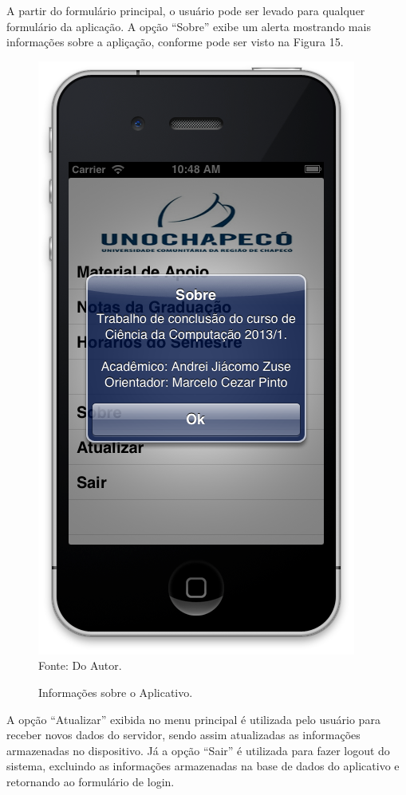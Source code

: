 A partir do formulário principal, o usuário pode ser levado para qualquer formulário da aplicação. A opção ``Sobre'' exibe um alerta mostrando mais informações sobre a apliçação, conforme pode ser visto na Figura 15.

\begin{figure}[!htb]
     \centering
     \caption[Formulário Principal - Sobre]{Informações sobre o Aplicativo.}
     \includegraphics[scale=0.34]{imagens/formsobre.png}
     \\  Fonte: Do Autor.
\end{figure}
\newpage

A opção ``Atualizar'' exibida no menu principal é utilizada pelo usuário para receber novos dados do servidor, sendo assim atualizadas as informações armazenadas no dispositivo. Já a opção ``Sair'' é utilizada para fazer logout do sistema, excluindo as informações armazenadas na base de dados do aplicativo e retornando ao formulário de login.

